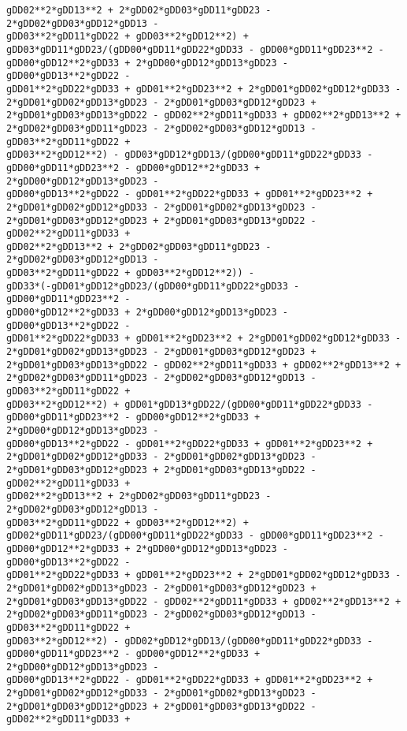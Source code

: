 \documentclass[landscape,letterpaper,10pt,english]{article}
\begin{document}
\begin{Verbatim}[commandchars=\\\{\}]
gDD02**2*gDD13**2 + 2*gDD02*gDD03*gDD11*gDD23 - 2*gDD02*gDD03*gDD12*gDD13 -
gDD03**2*gDD11*gDD22 + gDD03**2*gDD12**2) +
gDD03*gDD11*gDD23/(gDD00*gDD11*gDD22*gDD33 - gDD00*gDD11*gDD23**2 -
gDD00*gDD12**2*gDD33 + 2*gDD00*gDD12*gDD13*gDD23 - gDD00*gDD13**2*gDD22 -
gDD01**2*gDD22*gDD33 + gDD01**2*gDD23**2 + 2*gDD01*gDD02*gDD12*gDD33 -
2*gDD01*gDD02*gDD13*gDD23 - 2*gDD01*gDD03*gDD12*gDD23 +
2*gDD01*gDD03*gDD13*gDD22 - gDD02**2*gDD11*gDD33 + gDD02**2*gDD13**2 +
2*gDD02*gDD03*gDD11*gDD23 - 2*gDD02*gDD03*gDD12*gDD13 - gDD03**2*gDD11*gDD22 +
gDD03**2*gDD12**2) - gDD03*gDD12*gDD13/(gDD00*gDD11*gDD22*gDD33 -
gDD00*gDD11*gDD23**2 - gDD00*gDD12**2*gDD33 + 2*gDD00*gDD12*gDD13*gDD23 -
gDD00*gDD13**2*gDD22 - gDD01**2*gDD22*gDD33 + gDD01**2*gDD23**2 +
2*gDD01*gDD02*gDD12*gDD33 - 2*gDD01*gDD02*gDD13*gDD23 -
2*gDD01*gDD03*gDD12*gDD23 + 2*gDD01*gDD03*gDD13*gDD22 - gDD02**2*gDD11*gDD33 +
gDD02**2*gDD13**2 + 2*gDD02*gDD03*gDD11*gDD23 - 2*gDD02*gDD03*gDD12*gDD13 -
gDD03**2*gDD11*gDD22 + gDD03**2*gDD12**2)) -
gDD33*(-gDD01*gDD12*gDD23/(gDD00*gDD11*gDD22*gDD33 - gDD00*gDD11*gDD23**2 -
gDD00*gDD12**2*gDD33 + 2*gDD00*gDD12*gDD13*gDD23 - gDD00*gDD13**2*gDD22 -
gDD01**2*gDD22*gDD33 + gDD01**2*gDD23**2 + 2*gDD01*gDD02*gDD12*gDD33 -
2*gDD01*gDD02*gDD13*gDD23 - 2*gDD01*gDD03*gDD12*gDD23 +
2*gDD01*gDD03*gDD13*gDD22 - gDD02**2*gDD11*gDD33 + gDD02**2*gDD13**2 +
2*gDD02*gDD03*gDD11*gDD23 - 2*gDD02*gDD03*gDD12*gDD13 - gDD03**2*gDD11*gDD22 +
gDD03**2*gDD12**2) + gDD01*gDD13*gDD22/(gDD00*gDD11*gDD22*gDD33 -
gDD00*gDD11*gDD23**2 - gDD00*gDD12**2*gDD33 + 2*gDD00*gDD12*gDD13*gDD23 -
gDD00*gDD13**2*gDD22 - gDD01**2*gDD22*gDD33 + gDD01**2*gDD23**2 +
2*gDD01*gDD02*gDD12*gDD33 - 2*gDD01*gDD02*gDD13*gDD23 -
2*gDD01*gDD03*gDD12*gDD23 + 2*gDD01*gDD03*gDD13*gDD22 - gDD02**2*gDD11*gDD33 +
gDD02**2*gDD13**2 + 2*gDD02*gDD03*gDD11*gDD23 - 2*gDD02*gDD03*gDD12*gDD13 -
gDD03**2*gDD11*gDD22 + gDD03**2*gDD12**2) +
gDD02*gDD11*gDD23/(gDD00*gDD11*gDD22*gDD33 - gDD00*gDD11*gDD23**2 -
gDD00*gDD12**2*gDD33 + 2*gDD00*gDD12*gDD13*gDD23 - gDD00*gDD13**2*gDD22 -
gDD01**2*gDD22*gDD33 + gDD01**2*gDD23**2 + 2*gDD01*gDD02*gDD12*gDD33 -
2*gDD01*gDD02*gDD13*gDD23 - 2*gDD01*gDD03*gDD12*gDD23 +
2*gDD01*gDD03*gDD13*gDD22 - gDD02**2*gDD11*gDD33 + gDD02**2*gDD13**2 +
2*gDD02*gDD03*gDD11*gDD23 - 2*gDD02*gDD03*gDD12*gDD13 - gDD03**2*gDD11*gDD22 +
gDD03**2*gDD12**2) - gDD02*gDD12*gDD13/(gDD00*gDD11*gDD22*gDD33 -
gDD00*gDD11*gDD23**2 - gDD00*gDD12**2*gDD33 + 2*gDD00*gDD12*gDD13*gDD23 -
gDD00*gDD13**2*gDD22 - gDD01**2*gDD22*gDD33 + gDD01**2*gDD23**2 +
2*gDD01*gDD02*gDD12*gDD33 - 2*gDD01*gDD02*gDD13*gDD23 -
2*gDD01*gDD03*gDD12*gDD23 + 2*gDD01*gDD03*gDD13*gDD22 - gDD02**2*gDD11*gDD33 +

\end{Verbatim}
\end{document}
